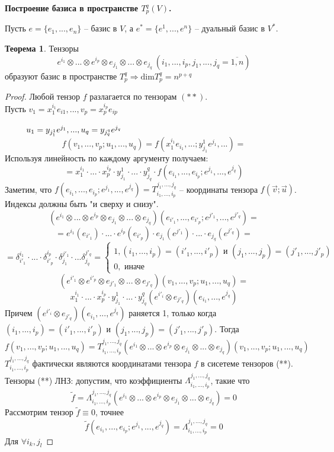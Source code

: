 \documentclass[a4paper, 12pt]{article}
\newcommand\tab[1][.5cm]{\hspace*{#1}}
\theoremstyle{definition}
\newtheorem*{theorem}{Теорема}
\begin{document}
    \begin{center}
        \textbf{Построение базиса в пространстве $T_p^q(V)$.}
    \end{center}
    Пусть $e = \{e_1,...,e_n\}$ -- базис в $V$, а $e^* = \{e^1,...,e^n\}$ -- дуальный базис в $V^*$.
    \begin{theorem}
        Тензоры 
        $$e^{i_1} \otimes ... \otimes e^{i_p} \otimes e_{j_1} \otimes ... \otimes e_{j_q}\ (i_1,...,i_p,j_1,...,j_q = \overline{1,n})$$ образуют базис в пространстве $T_p^q \Longrightarrow \text{dim}T_p^q = n^{p+q}$ 
    \end{theorem} 
    \begin{proof}
        Любой тензор $f$ разлагается по тензорам $(**)$.\\
        Пусть $v_1 = x_1^{i_1}e_{i1},..., v_p = x_p^{i_p}e_{ip}$

        $\tab[0.9cm]u_1 = y_{j_1^1}e^{j_1},..., u_q = y_{j_q^q}e^{j_q}$ 
        $$f(v_1,...,v_p;u_1,...,u_q) = f(x_1^{i_1}e_{i_1},...;y_{j_1}^1e^{j_1},...)= $$
        Используя линейность по каждому аргументу получаем:
        $$= x_1^{i_1}\cdot ... \cdot x_p^{i_p}\cdot y_{j_1}^1 \cdot ... \cdot y_{j_q}^q \cdot f(e_{i_1},...,e_{i_p};e^{j_1},...,e^{j_q})$$
        Заметим, что 
        $f(e_{i_1},...,e_{i_p};e^{j_1},...,e^{j_q}) = T_{i_1,...,i_p}^{j_1,...,j_q}$ -- координаты тензора $f(\vec v; \vec u)$.
        Индексы должны быть "и сверху и снизу".
        $$(e^{i_1} \otimes ... \otimes e^{i_p} \otimes e_{j_1} \otimes ... \otimes e_{j_q})(e_{i'_1},...,e_{i'_p};e^{j'_1},..., e^{j'_q}) =$$ 
        $$= e^{i_1}(e_{i'_1})\cdot ... \cdot e^{i_p}(e_{i'_p})\cdot e_{j_1}(e^{j'_1})\cdot ... \cdot e_{j_q}(e^{j'_q})= $$
        $$= \delta_{i'_1}^{i_1}\cdot ... \cdot \delta_{i'_p}^{i_p}\cdot \delta_{j_1}^{j'_1}\cdot ... \delta_{j_q}^{j'_q} = \begin{cases}
            1, (i_1,...,i_p) = (i'_1,...,i'_p) \text{ и } (j_1,...,j_p) = (j'_1,...,j'_p)\\
            0, \text{ иначе}
        \end{cases}$$
        $$(e^{i'_1} \otimes e^{i'_p} \otimes e_{j'_1} \otimes ... \otimes e_{j'_q})(v_1,...,v_p; u_1,...,u_q) = $$
        $$x_1^{i_1} \cdot ... \cdot x_p^{i_p}\cdot y_{j_1}^1 \cdot ... \cdot y_{j_q}^q(e^{i'_i}\otimes e_{j'_q})(e_{i_1},...,e^{j_q})$$
        Причем $(e^{i'_i}\otimes e_{j'_q})(e_{i_1},...,e^{j_q})$ раняется 1, только когда $(i_1,...,i_p) = (i'_1,...,i'_p)$ и $(j_1,...,j_p) = (j'_1,...,j'_p)$.
        Тогда 
        $$f(v_1,...,v_p;u_1,...,u_q) = T_{i_1,...,i_p}^{j_1,...,j_q}(e^{i_1}\otimes ... \otimes e^{i_p} \otimes e_{j_1} \otimes ... \otimes e_{j_q})(v_1,...,v_p;u_1,...,u_q)$$
        $T_{i_1,...,i_p}^{j_1,...,j_q}$ фактически являются координатами тензора $f$ в сисетеме тензоров (**).\\
        Тензоры (**) ЛНЗ: допустим, что коэффициенты $\Lambda_{i_1,...,i_p}^{j_1,...,j_q}$, такие что
        $$\widetilde{f} = \Lambda_{i_1,...,i_p}^{j_1,...,j_q}(e^{i_1}\otimes ... \otimes e^{i_p} \otimes e_{j_1} \otimes ... \otimes e_{j_q}) = 0$$
        Рассмотрим тензор $\widetilde{f} \equiv 0$, точнее 
        $$\widetilde{f}(e_{i_1},...,e_{i_p};e^{j_1},...,e^{j_q}) = \Lambda_{i_1,...,i_p}^{j_1,...,j_q} = 0$$ 
        Для $\forall i_k,j_l$ 
    \end{proof}
\end{document}
